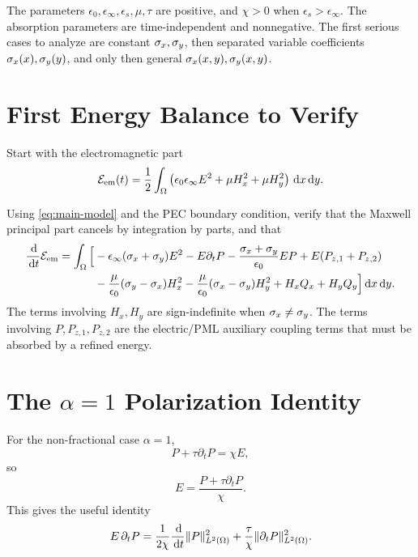 \documentclass[UTF8,a4paper,12pt]{ctexart}
\begin{document}
\begin{remark}
The parameters \(\epsilon_0,\epsilon_\infty,\epsilon_s,\mu,\tau\) are positive, and \(\chi>0\) when \(\epsilon_s>\epsilon_\infty\).  The absorption parameters are time-independent and nonnegative.  The first serious cases to analyze are constant \(\sigma_x,\sigma_y\), then separated variable coefficients \(\sigma_x(x),\sigma_y(y)\), and only then general \(\sigma_x(x,y),\sigma_y(x,y)\).
\end{remark}

\section{First Energy Balance to Verify}

Start with the electromagnetic part
\[
  \mathcal{E}_{\rm em}(t)=\frac12\int_\Omega
  \left(\epsilon_0\epsilon_\infty E^2+\mu H_x^2+\mu H_y^2\right)\,\mathrm{d} x\,\mathrm{d} y.
\]

\begin{task}
Using \eqref{eq:main-model} and the PEC boundary condition, verify that the Maxwell principal part cancels by integration by parts, and that
\[
\begin{aligned}
\frac{\,\mathrm{d}}{\,\mathrm{d} t}\mathcal{E}_{\rm em}
=\int_\Omega\Big[
&-\epsilon_\infty(\sigma_x+\sigma_y)E^2
-E\partial_tP
-\frac{\sigma_x+\sigma_y}{\epsilon_0}EP
+E(P_{z,1}+P_{z,2})\\
&-\frac{\mu}{\epsilon_0}(\sigma_y-\sigma_x)H_x^2
-\frac{\mu}{\epsilon_0}(\sigma_x-\sigma_y)H_y^2
+H_xQ_x+H_yQ_y
\Big]\,\mathrm{d} x\,\mathrm{d} y .
\end{aligned}
\label{eq:em-balance}
\]
The terms involving \(H_x,H_y\) are sign-indefinite when \(\sigma_x\ne\sigma_y\).  The terms involving \(P,P_{z,1},P_{z,2}\) are the electric/PML auxiliary coupling terms that must be absorbed by a refined energy.
\end{task}

\section{The \texorpdfstring{\(\alpha=1\)}{alpha=1} Polarization Identity}

For the non-fractional case \(\alpha=1\),
\[
  P+\tau\partial_tP=\chi E,
\]
so
\[
  E=\frac{P+\tau\partial_tP}{\chi}.
\]
This gives the useful identity
\begin{equation}
  E\,\partial_tP
  =\frac{1}{2\chi}\frac{\,\mathrm{d}}{\,\mathrm{d} t}\|P\|_{L^2(\Omega)}^2
   +\frac{\tau}{\chi}\|\partial_tP\|_{L^2(\Omega)}^2.
\label{eq:alpha-one-dissipation}
\end{equation}
\end{document}
